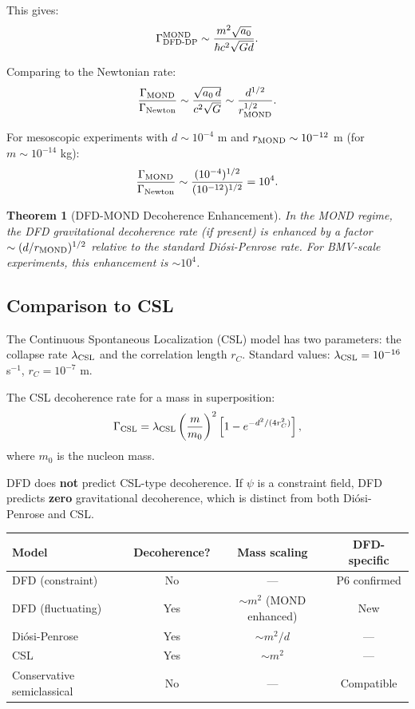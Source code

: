 \documentclass[11pt,a4paper]{article}
\newtheorem{theorem}{Theorem}
\begin{document}
This gives:
\begin{equation}
\Gamma_{\rm DFD\text{-}DP}^{\rm MOND} \sim \frac{m^2\sqrt{a_0}}{\hbar c^2\sqrt{Gd}}.
\end{equation}

Comparing to the Newtonian rate:
\begin{equation}
\frac{\Gamma_{\rm MOND}}{\Gamma_{\rm Newton}} \sim \frac{\sqrt{a_0\,d}}{c^2\sqrt{G}} \sim \frac{d^{1/2}}{r_{\rm MOND}^{1/2}}.
\end{equation}

For mesoscopic experiments with $d \sim 10^{-4}$ m and $r_{\rm MOND} \sim 10^{-12}$ m (for $m \sim 10^{-14}$ kg):
\begin{equation}
\frac{\Gamma_{\rm MOND}}{\Gamma_{\rm Newton}} \sim \frac{(10^{-4})^{1/2}}{(10^{-12})^{1/2}} = 10^4.
\end{equation}

\begin{theorem}[DFD-MOND Decoherence Enhancement]
In the MOND regime, the DFD gravitational decoherence rate (if present) is enhanced by a factor $\sim (d/r_{\rm MOND})^{1/2}$ relative to the standard Di\'{o}si-Penrose rate. For BMV-scale experiments, this enhancement is $\sim 10^4$.
\end{theorem}

\subsection{Comparison to CSL}
\label{sec:CSL-comparison}

The Continuous Spontaneous Localization (CSL) model has two parameters: the collapse rate $\lambda_{\rm CSL}$ and the correlation length $r_C$. Standard values: $\lambda_{\rm CSL} = 10^{-16}$ s$^{-1}$, $r_C = 10^{-7}$ m.

The CSL decoherence rate for a mass in superposition:
\begin{equation}
\Gamma_{\rm CSL} = \lambda_{\rm CSL}\left(\frac{m}{m_0}\right)^2\left[1 - e^{-d^2/(4r_C^2)}\right],
\end{equation}
where $m_0$ is the nucleon mass.

DFD does \textbf{not} predict CSL-type decoherence. If $\psi$ is a constraint field, DFD predicts \textbf{zero} gravitational decoherence, which is distinct from both Di\'{o}si-Penrose and CSL.

\begin{center}
\begin{tabular}{lccc}
\toprule
\textbf{Model} & \textbf{Decoherence?} & \textbf{Mass scaling} & \textbf{DFD-specific} \\
\midrule
DFD (constraint) & No & --- & P6 confirmed \\
DFD (fluctuating) & Yes & $\sim m^2$ (MOND enhanced) & New \\
Di\'{o}si-Penrose & Yes & $\sim m^2/d$ & --- \\
CSL & Yes & $\sim m^2$ & --- \\
Conservative semiclassical & No & --- & Compatible \\
\bottomrule
\end{tabular}
\end{center}
\end{document}
